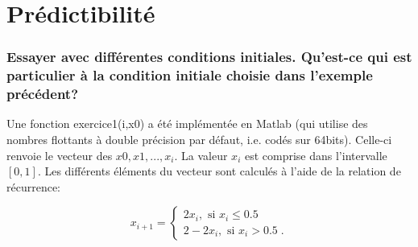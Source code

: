 \documentclass[a4paper, 12pt]{report}
\newcommand{\code}[1]{\textsf{#1}}
\begin{document}



\part{Prédictibilité}
\setcounter{section}{0}


\section{Essayer avec différentes conditions initiales.
Qu'est-ce qui est particulier à la condition initiale choisie dans l'exemple
précédent?}

Une fonction \code{exercice1(i,x0)} a été implémentée en Matlab (qui utilise
des nombres flottants à double précision par défaut, i.e. codés sur 64bits). Celle-ci
renvoie le vecteur des $x0,x1,...,x_i$. La valeur $x_i$ est comprise dans
l'intervalle $[0,1]$. Les différents éléments du vecteur
sont calculés à l'aide de la relation de récurrence:

\begin{equation}
  x_{i+1} = \left \{
  \begin{aligned}
    2x_i, \text{ si } x_i \le 0.5\\
    2-2x_i, \text{ si } x_i > 0.5 \;.
  \end{aligned} \right.
  \label{eq:chaos_rec}
\end{equation}
\end{document}
